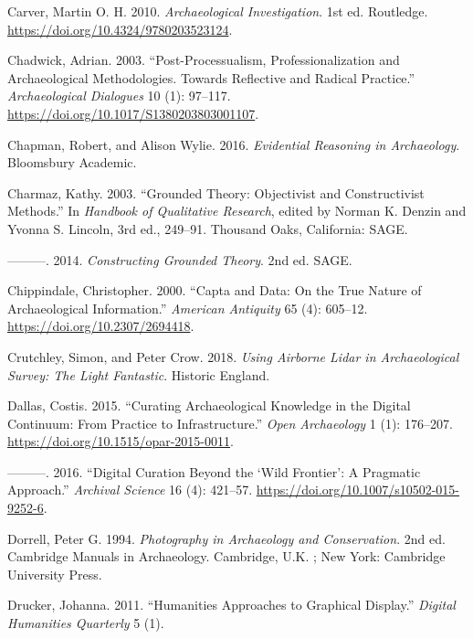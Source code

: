 \documentclass[
]{article}
\newlength{\cslhangindent}
\newenvironment{CSLReferences}[2] %
 {\begin{list}{}{%
  \setlength{\itemindent}{0pt}
  \setlength{\leftmargin}{0pt}
  \setlength{\parsep}{0pt}
  \ifodd #1
   \setlength{\leftmargin}{\cslhangindent}
   \setlength{\itemindent}{-1\cslhangindent}
  \fi
  \setlength{\itemsep}{#2\baselineskip}}}
 {\end{list}}
\begin{document}
\begin{CSLReferences}{1}{0}
Carver, Martin O. H. 2010. \emph{Archaeological {Investigation}}. 1st
ed. Routledge. \url{https://doi.org/10.4324/9780203523124}.

Chadwick, Adrian. 2003. {``Post-Processualism, Professionalization and
Archaeological Methodologies. {Towards} Reflective and Radical
Practice.''} \emph{Archaeological Dialogues} 10 (1): 97--117.
\url{https://doi.org/10.1017/S1380203803001107}.

Chapman, Robert, and Alison Wylie. 2016. \emph{Evidential {Reasoning} in
{Archaeology}}. Bloomsbury Academic.

Charmaz, Kathy. 2003. {``Grounded {Theory}: {Objectivist} and
{Constructivist Methods}.''} In \emph{Handbook of {Qualitative
Research}}, edited by Norman K. Denzin and Yvonna S. Lincoln, 3rd ed.,
249--91. Thousand Oaks, California: SAGE.

---------. 2014. \emph{Constructing {Grounded Theory}}. 2nd ed. SAGE.

Chippindale, Christopher. 2000. {``Capta and {Data}: {On} the {True
Nature} of {Archaeological Information}.''} \emph{American Antiquity} 65
(4): 605--12. \url{https://doi.org/10.2307/2694418}.

Crutchley, Simon, and Peter Crow. 2018. \emph{Using {Airborne Lidar} in
{Archaeological Survey}: {The Light Fantastic}}. Historic England.

Dallas, Costis. 2015. {``Curating {Archaeological Knowledge} in the
{Digital Continuum}: {From Practice} to {Infrastructure}.''} \emph{Open
Archaeology} 1 (1): 176--207.
\url{https://doi.org/10.1515/opar-2015-0011}.

---------. 2016. {``Digital Curation Beyond the {`{Wild} Frontier'}: {A}
Pragmatic Approach.''} \emph{Archival Science} 16 (4): 421--57.
\url{https://doi.org/10.1007/s10502-015-9252-6}.

Dorrell, Peter G. 1994. \emph{Photography in Archaeology and
Conservation}. 2nd ed. Cambridge Manuals in Archaeology. Cambridge, U.K.
; New York: Cambridge University Press.

Drucker, Johanna. 2011. {``Humanities {Approaches} to {Graphical
Display}.''} \emph{Digital Humanities Quarterly} 5 (1).


\end{CSLReferences}
\end{document}
